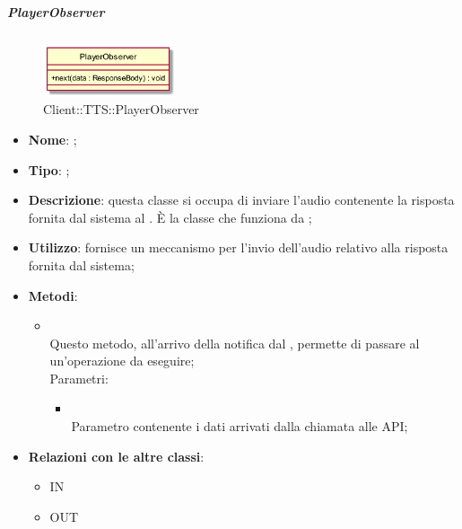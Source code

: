 \hypertarget{PlayerObserver_label}{\subparagraph{PlayerObserver}}
\begin{figure}[h]
	\centering
	\includegraphics[width=0.35\textwidth,height=\textheight,keepaspectratio]{images/ClassPlayerObserver.png}
	\caption{Client::TTS::PlayerObserver}
\end{figure}
\begin{itemize}
	\item \textbf{Nome}: ;
	\item \textbf{Tipo}: ;
	\item \textbf{Descrizione}: questa classe si occupa di inviare l'audio contenente la risposta fornita dal sistema al .
	È la classe che funziona da ;
	\item \textbf{Utilizzo}: fornisce un meccanismo per l'invio dell'audio relativo alla risposta fornita dal sistema;
	\item \textbf{Metodi}:
	\begin{itemize}
		\item[]  \\		Questo metodo, all'arrivo della notifica dal , permette di passare al  un'operazione da eseguire;\\
		Parametri:
		\begin{itemize}
			\item {} \\
			Parametro contenente i dati arrivati dalla chiamata alle API;
		\end{itemize}
	\end{itemize}
	\item \textbf{Relazioni con le altre classi}:
	\begin{itemize}
		\item IN \hyperlink{DataArrivedObservable_label}{}
		\item OUT \hyperlink{Player_label}{}
	\end{itemize}
\end{itemize}
\FloatBarrier

